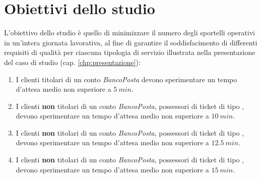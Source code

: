 \chapter{Obiettivi dello studio}\label{chp:obiettivi}
L'obiettivo dello studio è quello di minimizzare il numero degli sportelli operativi in un'intera giornata lavorativa, al fine di garantire il soddisfacimento di differenti requisiti di qualità per ciascuna tipologia di servizio illustrata nella presentazione del caso di studio (cap. \ref{chp:presentazione}):

\begin{enumerate}[label=QoS-\arabic*), align=left, leftmargin=*]
\item I clienti titolari di un conto \textsl{BancoPosta} devono sperimentare un tempo d'attesa medio non superiore a $5\ min$.
\item I clienti \textbf{non} titolari di un conto \textsl{BancoPosta}, possessori di ticket di tipo \uo{}, devono sperimentare un tempo d'attesa medio non superiore a $10\ min$.
\item I clienti \textbf{non} titolari di un conto \textsl{BancoPosta}, possessori di ticket di tipo \pp{}, devono sperimentare un tempo d'attesa medio non superiore a $12.5\ min$.
\item I clienti \textbf{non} titolari di un conto \textsl{BancoPosta}, possessori di ticket di tipo \sr{}, devono sperimentare un tempo d'attesa medio non superiore a $15\ min$.
\end{enumerate}